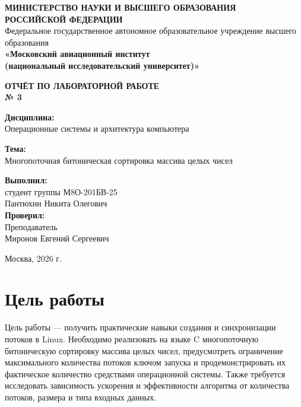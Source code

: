 \documentclass[12pt,a4paper]{article}
\newcommand{\studentName}{Пантюхин Никита Олегович}
\newcommand{\studentGroup}{М8О-201БВ-25}
\newcommand{\checkerName}{Миронов Евгений Сергеевич}
\begin{document}
\begin{titlepage}
\thispagestyle{empty}
\begin{center}
{\fontsize{10}{12}\selectfont\bfseries
МИНИСТЕРСТВО НАУКИ И ВЫСШЕГО ОБРАЗОВАНИЯ\\
РОССИЙСКОЙ ФЕДЕРАЦИИ}\\[0.2cm]
{\fontsize{10}{12}\selectfont
Федеральное государственное автономное образовательное учреждение высшего образования\\
\textbf{«Московский авиационный институт\\
(национальный исследовательский университет)»}}

\vspace{2.2cm}
{\fontsize{16}{19}\selectfont\bfseries ОТЧЁТ ПО ЛАБОРАТОРНОЙ РАБОТЕ}\\[0.15cm]
{\fontsize{16}{19}\selectfont\bfseries № 3}

\vspace{0.9cm}
\textbf{Дисциплина:}\\[0.15cm]
Операционные системы и архитектура компьютера

\vspace{0.7cm}
\textbf{Тема:}\\[0.15cm]
Многопоточная битоническая сортировка массива целых чисел

\vspace{2.0cm}
\begin{flushright}
\textbf{Выполнил:}\\[0.15cm]
студент группы \studentGroup\\[0.1cm]
\studentName\\[0.6cm]
\textbf{Проверил:}\\[0.15cm]
Преподаватель\\[0.1cm]
\checkerName
\end{flushright}
\vfill
Москва, 2026 г.
\end{center}
\end{titlepage}

\setcounter{page}{2}
\tableofcontents
\newpage

\section{Цель работы}
Цель работы --- получить практические навыки создания и синхронизации потоков в Linux. Необходимо реализовать на языке C многопоточную битоническую сортировку массива целых чисел, предусмотреть ограничение максимального количества потоков ключом запуска и продемонстрировать их фактическое количество средствами операционной системы. Также требуется исследовать зависимость ускорения и эффективности алгоритма от количества потоков, размера и типа входных данных.
\end{document}
